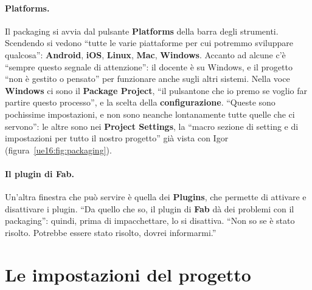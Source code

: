 \paragraph{Platforms.} Il packaging si avvia dal pulsante \textbf{Platforms} della barra degli
strumenti. Scendendo si vedono ``tutte le varie piattaforme per cui potremmo sviluppare
qualcosa'': \textbf{Android}, \textbf{iOS}, \textbf{Linux}, \textbf{Mac}, \textbf{Windows}.
Accanto ad alcune c'è ``sempre questo segnale di attenzione'': il docente è su Windows, e il
progetto ``non è gestito o pensato'' per funzionare anche sugli altri sistemi. Nella voce
\textbf{Windows} ci sono il \textbf{Package Project}, ``il pulsantone che io premo se voglio far
partire questo processo'', e la scelta della \textbf{configurazione}. ``Queste sono pochissime
impostazioni, e non sono neanche lontanamente tutte quelle che ci servono'': le altre sono nei
\textbf{Project Settings}, la ``macro sezione di setting e di impostazioni per tutto il nostro
progetto'' già vista con Igor (figura~\ref{ue16:fig:packaging}).

\paragraph{Il plugin di Fab.} Un'altra finestra che può servire è quella dei \textbf{Plugins},
che permette di attivare e disattivare i plugin. ``Da quello che so, il plugin di
\textbf{Fab} dà dei problemi con il packaging'': quindi, prima di impacchettare, lo si
disattiva. ``Non so se è stato risolto. Potrebbe essere stato risolto, dovrei informarmi.''

\section{Le impostazioni del progetto}
\label{ue16:sec:impostazioni}

